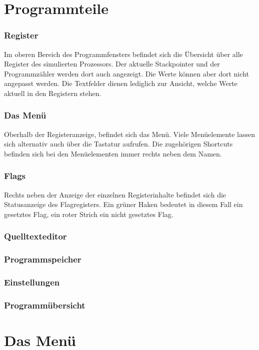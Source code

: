 \documentclass[11pt,a4paper]{hsfuldabook}
\begin{document}
\section{Programmteile}
\subsubsection{Register}
Im oberen Bereich des Programmfensters befindet sich die Übersicht über alle Register des simulierten
Prozessors. Der aktuelle Stackpointer und der Programmzähler werden dort auch angezeigt. Die Werte
können aber dort nicht angepasst werden. Die Textfelder dienen lediglich zur Ansicht, welche Werte
aktuell in den Registern stehen.

\subsubsection{Das Menü}
Oberhalb der Registeranzeige, befindet sich das Menü. Viele Menüelemente lassen sich alternativ auch
über die Tastatur aufrufen. Die zugehörigen Shortcuts befinden sich bei den Menüelementen immer rechts
neben dem Namen.

\subsubsection{Flags}
Rechts neben der Anzeige der einzelnen Registerinhalte befindet sich die Statusanzeige des
Flagregisters. Ein grüner Haken bedeutet in diesem Fall ein gesetztes Flag, ein roter Strich ein
nicht gesetztes Flag.

\subsubsection{Quelltexteditor}

\subsubsection{Programmspeicher}

\subsubsection{Einstellungen}

\subsubsection{Programmübersicht}

\section{Das Menü}
\end{document}
